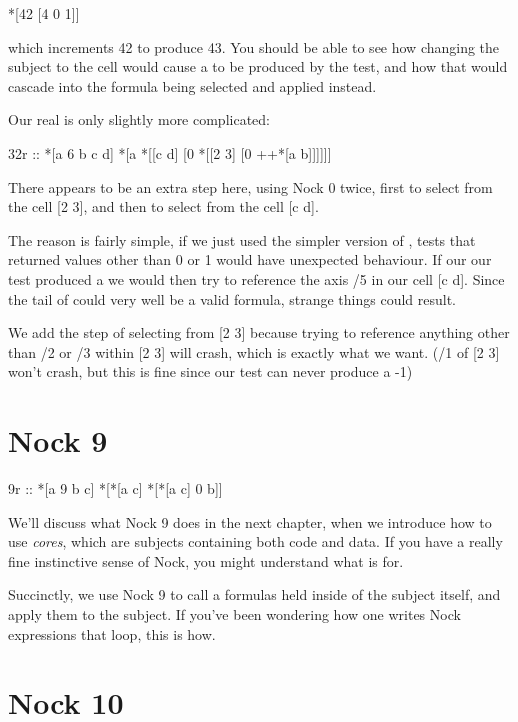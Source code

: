 \begin{code}
*[42 [4 0 1]]
\end{code}
which increments 42 to produce 43. You should be able to see how changing the subject to the cell \kode{[40 43]} would cause a  to be produced by the test, and how that would cascade into the  formula \kode{[4 0 2]} being selected and applied instead.

Our real  is only slightly more complicated:

\begin{code}
32r ::    *[a 6 b c d]     *[a *[[c d] [0 *[[2 3] [0 ++*[a b]]]]]]
\end{code}
There appears to be an extra step here, using Nock 0 twice, first to select from the cell [2 3], and then to select from the cell [c d]. 

The reason is fairly simple, if we just used the simpler version of , tests that returned values other than 0 or 1 would have unexpected behaviour. If our our test produced a  we would then try to reference the axis /5 in our cell [c d]. Since the tail of  could very well be a valid formula, strange things could result.

We add the step of selecting from [2 3] because trying to reference anything other than /2 or /3 within [2 3] will crash, which is exactly what we want. (/1 of [2 3] won't crash, but this is fine since our test can never produce a -1)

\section{Nock 9}

\begin{code}
9r ::     *[a 9 b c]        *[*[a c] *[*[a c] 0 b]] 
\end{code}
We'll discuss what Nock 9 does in the next chapter, when we introduce how to
use \emph{cores}, which are subjects containing both code and data.  If you have a
really fine instinctive sense of Nock, you might understand what  is for.

Succinctly, we use Nock 9 to call a formulas held inside of the subject itself,
and apply them to the subject. If you've been wondering how one writes Nock
expressions that loop, this is how.

\section{Nock 10}

